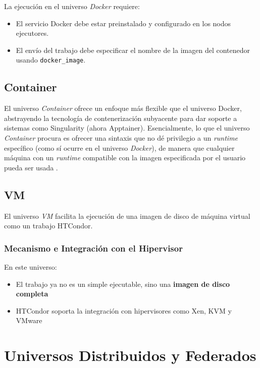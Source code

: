 La ejecución en el universo \textit{Docker} requiere:

\begin{itemize}
	\item El servicio Docker debe estar preinstalado y configurado en los nodos ejecutores.
	\item El envío del trabajo debe especificar el nombre de la imagen del contenedor usando \texttt{docker\_image}.
\end{itemize}


\subsection{Container}

El universo \textit{Container} ofrece un enfoque más flexible que el universo Docker, abstrayendo la tecnología de contenerización subyacente para dar soporte a sistemas como Singularity (ahora Apptainer). Esencialmente, lo que el universo \textit{Container} procura es ofrecer una sintaxis que no dé privilegio a un \textit{runtime} específico (como sí ocurre en el universo \textit{Docker}), de manera que cualquier máquina con un \textit{runtime} compatible con la imagen especificada por el usuario pueda ser usada \citep{HTCondor-env-services}.


\subsection{VM}

El universo \textit{VM} facilita la ejecución de una imagen de disco de máquina virtual como un trabajo HTCondor.
\subsubsection{Mecanismo e Integración con el Hipervisor}

En este universo:

\begin{itemize}
	\item El trabajo ya no es un simple ejecutable, sino una \textbf{imagen de disco completa}
	\item HTCondor soporta la integración con hipervisores como Xen, KVM y VMware \citep{HTCondor_vm_universe_wiki}
\end{itemize}

\section{Universos Distribuidos y Federados}

